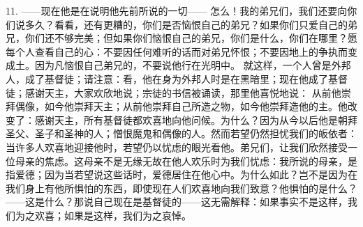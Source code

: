 11. ——现在他是在说明他先前所说的一切—— 怎么！我的弟兄们，我们还要向你们说多久？看看，还有更糟的，你们是否恼恨自己的弟兄？如果你们只爱自己的弟兄，你们还不够完美；但如果你们恼恨自己的弟兄，你们是什么，你们在哪里？愿每个人查看自己的心：不要因任何难听的话而对弟兄怀恨；不要因地上的争执而变成土。因为凡恼恨自己弟兄的，不要说他行在光明中。 就这样，一个人曾是外邦人，成了基督徒；请注意：看，他在身为外邦人时是在黑暗里；现在他成了基督徒；感谢天主，大家欢欣地说；宗徒的书信被诵读，那里他喜悦地说： 从前他崇拜偶像，如今他崇拜天主；从前他崇拜自己所造之物，如今他崇拜造他的主。他改变了：感谢天主，所有基督徒都欢喜地向他问候。为什么？因为从今以后他是朝拜圣父、圣子和圣神的人；憎恨魔鬼和偶像的人。然而若望仍然担忧我们的皈依者：当许多人欢喜地迎接他时，若望仍以忧虑的眼光看他。弟兄们，让我们欣然接受一位母亲的焦虑。这母亲不是无缘无故在他人欢乐时为我们忧虑：我所说的母亲，是指爱德；因为当若望说这些话时，爱德居住在他心中。为什么如此？岂不是因为在我们身上有他所惧怕的东西，即使现在人们欢喜地向我们致意？他惧怕的是什么？——这是什么？那说自己现在是基督徒的——这无需解释：如果事实不是这样，我们为之欢喜；如果是这样，我们为之哀悼。\par

